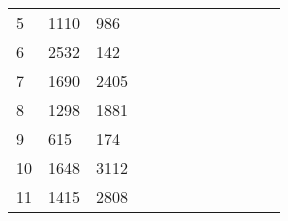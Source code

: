 \begin{table}[tb]
\begin{tabular}{|l|l|l|lllllllll}
		5  & 1110 & 986  &                           &                           &                           &                           &                           &                           &                          &                          &                           \\ \cline{1-3}
		6  & 2532 & 142  &                           &                           &                           &                           &                           &                           &                          &                          &                           \\ \cline{1-3}
		7  & 1690 & 2405 &                           &                           &                           &                           &                           &                           &                          &                          &                           \\ \cline{1-3}
		8  & 1298 & 1881 &                           &                           &                           &                           &                           &                           &                          &                          &                           \\ \cline{1-3}
		9  & 615  & 174  &                           &                           &                           &                           &                           &                           &                          &                          &                           \\ \cline{1-3}
		10 & 1648 & 3112 &                           &                           &                           &                           &                           &                           &                          &                          &                           \\ \cline{1-3}
		11 & 1415 & 2808 &                           &                           &                           &                           &                           &                           &                          &                          &                           \\ \cline{1-3}
	\end{tabular}
	
	
\end{table}


